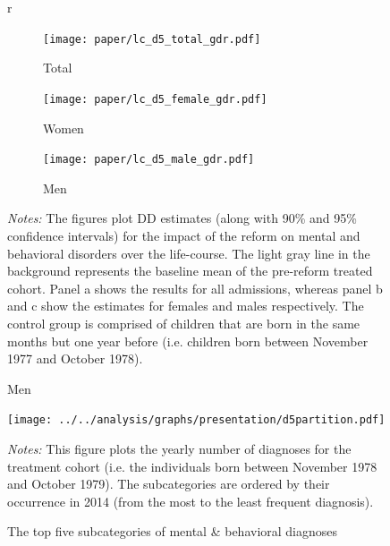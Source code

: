 \documentclass[11pt, a4paper]{article} %
\begin{document}
\vspace*{\fill}
\begin{figure}[H]\centering
	\caption{Life-course approach for mental and behavioral disorders}\label{fig: lc_d5_gdr_DD}r	\begin{subfigure}[h]{0.48\linewidth}\centering\caption{Total}
		\texttt{[image: paper/lc\_d5\_total\_gdr.pdf]}
	\end{subfigure}
	
	
	\begin{subfigure}[h]{0.48\linewidth}\centering\caption{Women}
		\texttt{[image: paper/lc\_d5\_female\_gdr.pdf]}
	\end{subfigure}
	\quad
	\begin{subfigure}[h]{0.48\linewidth}\centering\caption{Men}
		\texttt{[image: paper/lc\_d5\_male\_gdr.pdf]}
	\end{subfigure}
	\scriptsize
	\begin{minipage}{\linewidth}
		\emph{Notes:} The figures plot DD estimates (along with 90\% and 95\% confidence intervals) for the impact of the reform on mental and behavioral disorders over the life-course. The light gray line in the background represents the baseline mean of the pre-reform treated cohort. Panel a shows the results for all admissions, whereas panel b and c show the estimates for females and males respectively. The control group is comprised of children	that are born in the same months but one year before (i.e. children born between November 1977 and October 1978).
	\end{minipage}
\end{figure}
\vspace*{\fill}\clearpage
\vspace*{\fill}
\begin{figure}[H]\centering
	\caption{The top five subcategories of mental \& behavioral diagnoses}\label{fig: d5partition}
	\texttt{[image: ../../analysis/graphs/presentation/d5partition.pdf]}
	\scriptsize
	\begin{minipage}{0.9\linewidth}
	\emph{Notes:} This figure plots the yearly number of diagnoses for the treatment cohort (i.e. the individuals born between November 1978 and October 1979). The subcategories are ordered by their occurrence in 2014 (from the most to the least frequent diagnosis).
	\end{minipage}
\end{figure}
\vspace*{\fill}\clearpage
\newpage
\end{document}
